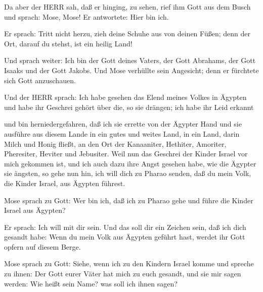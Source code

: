  Da aber der HERR sah, daß er hinging, zu sehen, rief ihm
Gott aus dem Busch und sprach: Mose, Mose! Er antwortete: Hier bin ich.

 Er sprach: Tritt nicht herzu, zieh deine Schuhe aus von
deinen Füßen; denn der Ort, darauf du stehst, ist ein heilig Land!

 Und sprach weiter: Ich bin der Gott deines Vaters, der Gott
Abrahams, der Gott Isaaks und der Gott Jakobs. Und Mose verhüllte sein
Angesicht; denn er fürchtete sich Gott anzuschauen.

 Und der HERR sprach: Ich habe gesehen das Elend meines
Volkes in Ägypten und habe ihr Geschrei gehört über die, so sie drängen;
ich habe ihr Leid erkannt

 und bin herniedergefahren, daß ich sie errette von der
Ägypter Hand und sie ausführe aus diesem Lande in ein gutes und weites
Land, in ein Land, darin Milch und Honig fließt, an den Ort der
Kanaaniter, Hethiter, Amoriter, Pheresiter, Heviter und Jebusiter.
 Weil nun das Geschrei der Kinder Israel vor mich gekommen
ist, und ich auch dazu ihre Angst gesehen habe, wie die Ägypter sie
ängsten,  so gehe nun hin, ich will dich zu Pharao senden,
daß du mein Volk, die Kinder Israel, aus Ägypten führest.

 Mose sprach zu Gott: Wer bin ich, daß ich zu Pharao gehe
und führe die Kinder Israel aus Ägypten?

 Er sprach: Ich will mit dir sein. Und das soll dir ein
Zeichen sein, daß ich dich gesandt habe: Wenn du mein Volk aus Ägypten
geführt hast, werdet ihr Gott opfern auf diesem Berge.

 Mose sprach zu Gott: Siehe, wenn ich zu den Kindern Israel
komme und spreche zu ihnen: Der Gott eurer Väter hat mich zu euch
gesandt, und sie mir sagen werden: Wie heißt sein Name? was soll ich
ihnen sagen?

